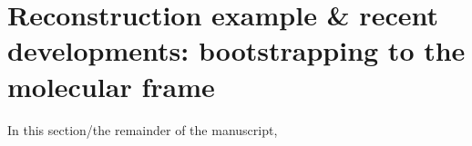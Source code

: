 \section{Reconstruction example & recent developments: bootstrapping to the molecular frame}

In this section/the remainder of the manuscript, 
